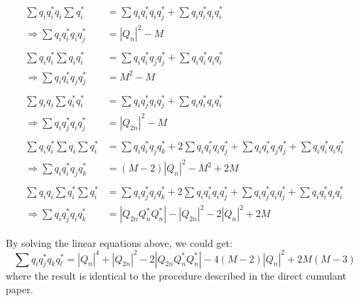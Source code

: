 \begin{equation}
\begin{split}
\sum q_{i}^{}q_{i}^{*}q_{i}^{} \sum q_{i}^{*} &= \sum q_{i}^{}q_{i}^{*}q_{i}^{}q_{j}^{*} + \sum q_{i}^{}q_{i}^{*}q_{i}^{}q_{i}^{*} \\
\Rightarrow \sum q_{i}^{}q_{i}^{*}q_{i}^{}q_{j}^{*} &= |Q_{n}|^{2}-M \\
& \\
\sum q_{i}^{}q_{i}^{*}\sum q_{i}^{}q_{i}^{*} &= \sum q_{i}^{}q_{i}^{*}q_{j}^{}q_{j}^{*} + \sum q_{i}^{}q_{i}^{*}q_{i}^{}q_{i}^{*} \\
\Rightarrow \sum q_{i}^{}q_{i}^{*}q_{j}^{}q_{j}^{*} &= M^{2}-M \\
& \\
\sum q_{i}^{}q_{i}^{} \sum q_{i}^{*}q_{i}^{*} &= \sum q_{i}^{}q_{j}^{*}q_{i}^{}q_{j}^{*} + \sum q_{i}^{}q_{i}^{*}q_{i}^{}q_{i}^{*} \\
\Rightarrow \sum q_{i}^{}q_{j}^{*}q_{i}^{}q_{j}^{*} &= |Q_{2n}|^{2}-M \\
& \\
\sum q_{i}^{}q_{i}^{*} \sum q_{i}^{} \sum q_{i}^{*} &= \sum q_{i}^{}q_{i}^{*}q_{j}^{}q_{k}^{*} + 2 \sum q_{i}^{}q_{i}^{*}q_{i}^{}q_{j}^{*} + \sum q_{i}^{}q_{i}^{*}q_{j}^{}q_{j}^{*} + \sum q_{i}^{}q_{i}^{*}q_{i}^{}q_{i}^{*} \\
\Rightarrow \sum q_{i}^{}q_{i}^{*}q_{j}^{}q_{k}^{*} &= (M-2)|Q_{n}|^{2}-M^{2}+2M \\
& \\
\sum q_{i}^{}q_{i}^{}\sum q_{i}^{*}\sum q_{i}^{*} &= \sum q_{i}^{}q_{j}^{*}q_{i}^{}q_{k}^{*} + 2\sum q_{i}^{}q_{i}^{*}q_{i}^{}q_{j}^{*} + \sum q_{i}^{}q_{j}^{*}q_{i}^{}q_{j}^{*} + \sum q_{i}^{}q_{i}^{*}q_{i}^{}q_{i}^{*} \\
\Rightarrow \sum q_{i}^{}q_{j}^{*}q_{i}^{}q_{k}^{*} &= |Q_{2n}^{}Q_{n}^{*}Q_{n}^{*}|-|Q_{2n}|^{2}-2|Q_{n}|^{2}+2M
\end{split}
\end{equation}

By solving the linear equations above, we could get:
\begin{equation}
\sum q_{i}^{}q_{j}^{*}q_{k}^{}q_{l}^{*} = |Q_{n}|^{4}+|Q_{2n}|^{2}-2|Q_{2n}^{}Q_{n}^{*}Q_{n}^{*}|-4(M-2)|Q_{n}|^{2}+2M(M-3)
\end{equation}
where the result is identical to the procedure described in the direct cumulant paper.

